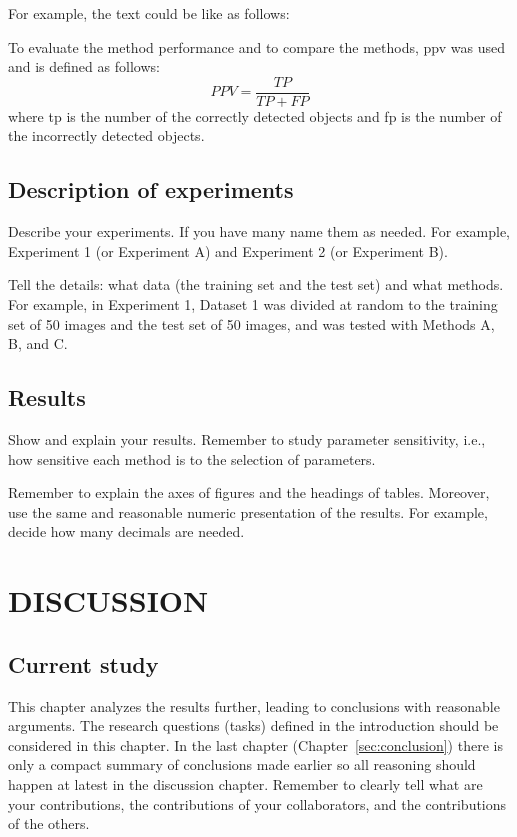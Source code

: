 \documentclass{lutmscthesis}[2017/10/03]
\begin{document}
For example, the text could be like as follows:

To evaluate the method performance and to compare the methods, 
\gls{ppv} was used and is defined as follows:
\begin{equation}
PPV = \frac{TP}{TP+FP}
\end{equation}
where \gls{tp} is the number of the correctly detected objects and 
\gls{fp} is the number of the incorrectly detected objects.
 
\subsection{Description of experiments}

Describe your experiments. If you have many name them as needed. For example, Experiment 1 (or Experiment A) and Experiment 2 (or Experiment B). 

Tell the details: what data (the training set and the test set) and what methods. For example, in Experiment 1, Dataset 1 was divided at random to the training set of 50 images and the test set of 50 images, and was tested with Methods A, B, and C. 

\subsection{Results}

Show and explain your results. Remember to study parameter sensitivity, i.e., how sensitive each method is to the selection of parameters. 

Remember to explain the axes of figures and the headings of tables. Moreover, use the same and reasonable numeric presentation of the results. For example, decide how many decimals are needed. 

\section{DISCUSSION}
\label{sec:discussion}

\subsection{Current study}

This chapter analyzes the results further, leading to conclusions with reasonable arguments. 
The research questions (tasks) defined in the introduction should be considered in this chapter. 
In the last chapter (Chapter~\ref{sec:conclusion}) there is only a compact summary of conclusions made earlier 
so all reasoning should happen at latest in the discussion chapter. 
Remember to clearly tell what are your contributions, 
the contributions of your collaborators, and the contributions of the others. 
\end{document}
